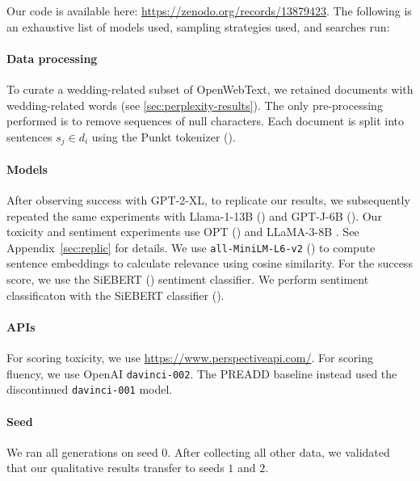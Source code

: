 \documentclass{article}
\theoremstyle{plain}
\theoremstyle{definition}
\theoremstyle{remark}
\begin{document}
Our code is available here: 
\url{https://zenodo.org/records/13879423}.
The following is an exhaustive list of models used, sampling strategies used, and searches run:

\paragraph{Data processing} To curate a wedding-related subset of OpenWebText, we retained documents with wedding-related words (see \cref{sec:perplexity-results}). The only pre-processing performed is to remove sequences of null characters. Each document is split into sentences $s_j \in d_i$ using the Punkt tokenizer (\cite{punkt}). 

\paragraph{Models} After observing success with GPT-2-XL, to replicate our results, we subsequently repeated the same experiments with Llama-1-13B (\cite{touvron2023llama}) and GPT-J-6B  (\cite{gptj}). Our toxicity and sentiment experiments use OPT (\cite{zhang2022opt}) and LLaMA-3-8B \cite{llama3}. See Appendix~\ref{sec:replic} for details. We use \texttt{all-MiniLM-L6-v2} (\cite{reimers2019sentence}) to compute sentence embeddings to calculate relevance using cosine similarity. For the success score, we use the SiEBERT (\cite{hartmann2023more}) sentiment classifier. We perform sentiment classificaton with the SiEBERT classifier (\citep{hartmann2023more}).


\paragraph{APIs}
For scoring toxicity, we use \url{https://www.perspectiveapi.com/}. For scoring fluency, we use OpenAI \texttt{davinci-002}. The PREADD baseline instead used the discontinued \texttt{davinci-001} model. 

\paragraph{Seed} We ran all generations on seed $0$. After collecting all other data, we validated that our qualitative results transfer to seeds $1$ and $2$.
\end{document}
